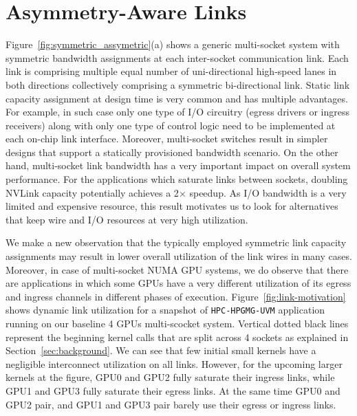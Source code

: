 \section{Asymmetry-Aware Links}
\label{sec:interconnect}

Figure~\ref{fig:symmetric_assymetric}(a) shows a generic multi-socket system
with symmetric bandwidth assignments at each inter-socket communication link.
Each link is comprising multiple equal number of uni-directional high-speed
lanes in both directions collectively comprising a symmetric bi-directional
link.  Static link capacity assignment at design time is very common and has
multiple advantages. For example, in such case only one type of I/O circuitry
(egress drivers or ingress receivers) along with only one type of control logic
need to be implemented at each on-chip link interface. Moreover, multi-socket
switches result in simpler designs that support a statically provisioned
bandwidth scenario. On the other hand, multi-socket link bandwidth has a very
important impact on overall system performance. For the applications which
saturate links between sockets, doubling NVLink capacity potentially achieves a
2$\times$ speedup. As I/O bandwidth is a very limited and expensive resource,
this result motivates us to look for alternatives that keep wire and I/O
resources at very high utilization. 

We make a new observation that the typically employed symmetric link capacity
assignments may result in lower overall utilization of the link wires in many
cases. Moreover, in case of multi-socket NUMA GPU systems, we do observe that
there are applications in which some GPUs have a very different utilization of
its egress and ingress channels in different phases of execution.
Figure~\ref{fig:link-motivation} shows dynamic link utilization for a snapshot
of \texttt{HPC-HPGMG-UVM} application running on our baseline 4 GPUs
multi-scocket system. Vertical dotted black lines represent the beginning
kernel calls that are split across 4 sockets as explained in
Section~\ref{sec:background}. We can see that few initial small kernels have a
negligible interconnect utilization on all links. However, for the upcoming
larger kernels at the figure, GPU0 and GPU2 fully saturate their ingress links,
while GPU1 and GPU3 fully saturate their egress links. At the same time GPU0 
and GPU2 pair, and GPU1 and GPU3 pair barely use their egress or ingress links.

